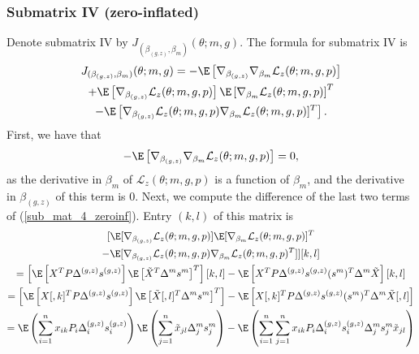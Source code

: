 \documentclass[12pt]{article}
\begin{document}
\begin{appendices}
\subsubsection*{Submatrix IV (zero-inflated)}
Denote submatrix IV by $J_{(\beta_{(g,z)}, \beta_m)}(\theta; m, g)$. The formula for submatrix IV is
\begin{multline}\label{sub_mat_4_zeroinf}
J_{(\beta_{(g,z)}, \beta_m)}(\theta; m, g) = - \E \left[\nabla_{\beta_{(g,z)}} \nabla_{\beta_m} \mathcal{L}_z (\theta; m, g, p) \right] \\ + \E\left[ \nabla_{\beta_{(g,z)} }\mathcal{L}_z(\theta ; m,g,p) \right]\E\left[\nabla_{\beta_m}\mathcal{L}_z(\theta; m,g,p)\right]^T \\ - \E \left[\nabla_{\beta_{(g,z)}}\mathcal{L}_z (\theta; m,g,p) \nabla_{\beta_m}\mathcal{L}_z(\theta; m,g,p)]^T \right].
\end{multline} 
First, we have that
\begin{equation}\label{sub_mat_4_zeroinf_1}
- \E \left[\nabla_{\beta_{(g,z)}} \nabla_{\beta_m} \mathcal{L}_z (\theta; m, g, p) \right] = 0,
\end{equation}
 as the derivative in $\beta_m$ of $\mathcal{L}_z(\theta; m, g, p)$ is a function of $\beta_m$, and the derivative in $\beta_{(g,z)}$ of this term is $0$. Next, we compute the difference of the last two terms of (\ref{sub_mat_4_zeroinf}). Entry $(k,l)$ of this matrix is
\begin{multline}\label{sub_mat_4_zeroinf_2}
[\E[\nabla_{\beta_{(g,z)}}\mathcal{L}_z(\theta; m, g, p) ] \E [\nabla_{\beta_m} \mathcal{L}_z(\theta; m, g, p) ]^T \\ - \E [\nabla_{\beta_{(g,z)}} \mathcal{L}_z(\theta; m, g, p) \nabla_{\beta_m}\mathcal{L}_z(\theta; m, g, p)^T ] ][k,l] \\ 
= \left[ \E \left[ {X}^T P \Delta^{(g,z)} s^{(g,z)} \right] \E\left[\tilde{X}^T \Delta^m s^m\right]^T\right][k,l] - \E \left[{X}^T P \Delta^{(g,z)} s^{(g,z)} (s^m)^T \Delta^m \tilde{X} \right][k,l] \\ = \left[\E\left[{X}[,k]^T P \Delta^{(g,z)} s^{(g,z)}\right]\E\left[\tilde{X}[,l]^T \Delta^m s^m\right]^T\right] - \E \left[{X}[,k]^T P \Delta^{(g,z)} s^{(g,z)} (s^m)^T \Delta^m \tilde{X}[,l] \right] \\ = \E\left(\sum_{i=1}^n x_{ik} P_i \Delta^{(g,z)}_i s^{(g,z)}_i\right) \E \left(\sum_{j=1}^n \tilde{x}_{jl} \Delta^m_j s^m_j \right) - \E \left(\sum_{i=1}^n \sum_{j=1}^n x_{ik} P_i \Delta^{(g,z)}_i s^{(g,z)}_i \Delta^m_j s^m_j \tilde{x}_{jl}  \right) \\ 

\end{multline}
\end{appendices}
\end{document}
